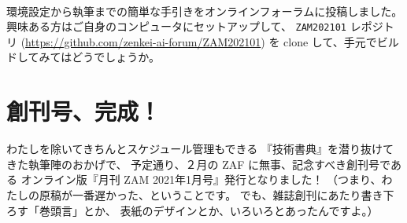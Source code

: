 \documentclass[dvipdfmx,autodetect-engine,10pt,b5paper,papersize,openany,dvipsnames]{jsbook}
\begin{document}
\begin{multicols}{2}
\vspace{5.0cm}


\vspace{7.0cm}



\vspace{7.0cm}

環境設定から執筆までの簡単な手引きをオンラインフォーラムに投稿しました。
興味ある方はご自身のコンピュータにセットアップして、
\texttt{ZAM202101} レポジトリ
(\url{https://github.com/zenkei-ai-forum/ZAM202101})
を clone して、手元でビルドしてみてはどうでしょうか。


\section{創刊号、完成！}
わたしを除いてきちんとスケジュール管理もできる
『技術書典』を潜り抜けてきた執筆陣のおかげで、
予定通り、２月の ZAF に無事、記念すべき創刊号である
オンライン版『月刊 ZAM 2021年1月号』発行となりました！
（つまり、わたしの原稿が一番遅かった、ということです。
でも、雑誌創刊にあたり書き下ろす「巻頭言」とか、
表紙のデザインとか、いろいろとあったんですよ。）


\end{multicols}
\end{document}
